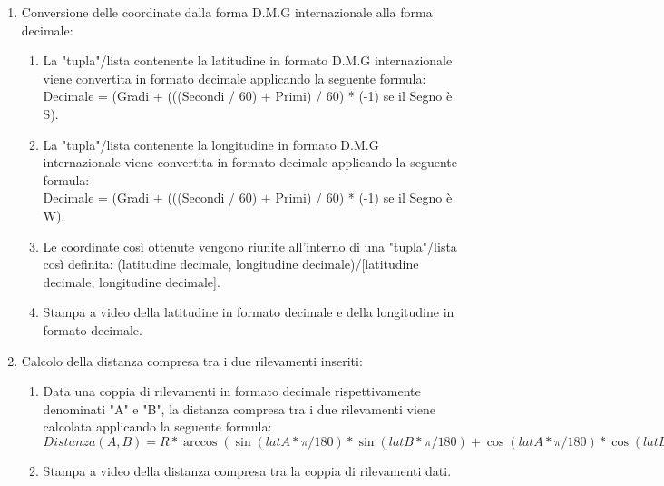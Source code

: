 \documentclass{article}
\begin{document}
\begin{enumerate}
	\item Conversione delle coordinate dalla forma D.M.G internazionale alla forma decimale:
	\begin{enumerate}
		\item La "tupla"/lista contenente la latitudine in formato D.M.G internazionale viene convertita in formato decimale applicando la seguente formula: \\Decimale = (Gradi + (((Secondi / 60) + Primi) / 60) * (-1) se il Segno è  S). 
		\item La "tupla"/lista contenente la longitudine in formato D.M.G internazionale viene convertita in formato decimale applicando la seguente formula: \\Decimale = (Gradi + (((Secondi / 60) + Primi) / 60) * (-1) se il Segno è  W).
		\item Le coordinate così ottenute vengono riunite all'interno di una "tupla"/lista così definita: (latitudine decimale, longitudine decimale)/[latitudine decimale, longitudine decimale].
		\item Stampa a video della latitudine in formato decimale e della longitudine in formato decimale.
	\end{enumerate}

	\item Calcolo della distanza compresa tra i due rilevamenti inseriti: 
	\begin{enumerate}
		\item Data una coppia di rilevamenti in formato decimale rispettivamente denominati "A" e "B", la distanza compresa tra i due rilevamenti viene calcolata applicando la seguente formula: \\$Distanza(A, B) = R * \arccos(\sin(latA * \pi / 180) * \sin(latB * \pi / 180) + \cos(latA * \pi / 180) * \cos(latB * \pi / 180) * \cos((lonA - lonB) * \pi / 180)). $
		\item Stampa a video della distanza compresa tra la coppia di rilevamenti dati.
	\end{enumerate}


\end{enumerate}
\end{document}
